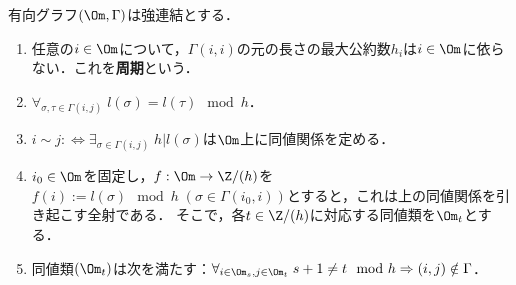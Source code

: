 \documentclass[uplatex, dvipdfmx]{jsreport}
\begin{document}
\begin{lemma}[強連結な有向グラフの周期]
    有向グラフ$(\Om,\Gamma)$は強連結とする．
    \begin{enumerate}
        \item 任意の$i\in\Om$について，$\Gamma(i,i)$の元の長さの最大公約数$h_i$は$i\in\Om$に依らない．これを\textbf{周期}という．
        \item $\forall_{\sigma,\tau\in\Gamma(i,j)}\;l(\sigma)=l(\tau)\mod h$．
        \item $i\sim j:\Leftrightarrow\exists_{\sigma\in\Gamma(i,j)}\;h|l(\sigma)$は$\Om$上に同値関係を定める．
        \item $i_0\in\Om$を固定し，$f:\Om\to\Z/(h)$を$f(i):=l(\sigma)\mod h\;(\sigma\in\Gamma(i_0,i))$とすると，これは上の同値関係を引き起こす全射である．
        そこで，各$t\in\Z/(h)$に対応する同値類を$\Om_t$とする．
        \item 同値類$(\Om_t)$は次を満たす：$\forall_{i\in\Om_s,j\in\Om_t}\;s+1\ne t\mod h\Rightarrow (i,j)\notin\Gamma$．
    \end{enumerate}
\end{lemma}
\end{document}

